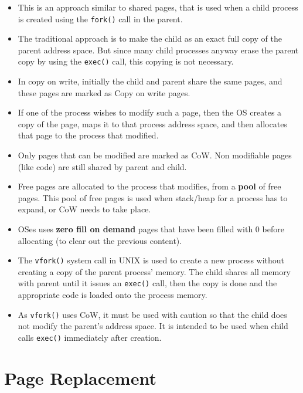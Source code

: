 \documentclass{article}
\theoremstyle{plain}
\theoremstyle{definition}
\begin{document}
\begin{itemize}
    \item This is an approach similar to shared pages, that is used when a child process is created using the \texttt{fork()} call in the parent. 
    
    \item The traditional approach is to make the child as an exact full copy of the parent address space. But since many child processes anyway erase the parent copy by using the \texttt{exec()} call, this copying is not necessary. 
    
    \item In copy on write, initially the child and parent share the same pages, and these pages are marked as Copy on write pages. 
    
    \item If one of the process wishes to modify such a page, then the OS creates a copy of the page, maps it to that process address space, and then allocates that page to the process that modified. 
    
    \item Only pages that can be modified are marked as CoW. Non modifiable pages (like code) are still shared by parent and child. 
    
    \item Free pages are allocated to the process that modifies, from a \textbf{pool} of free pages. This pool of free pages is used when stack/heap for a process has to expand, or CoW needs to take place. 
    
    \item OSes uses \textbf{zero fill on demand} pages that have been filled with 0 before allocating (to clear out the previous content). 
    
    \item The \texttt{vfork()} system call in UNIX is used to create a new process without creating a copy of the parent process' memory. The child shares all memory with parent until it issues an \texttt{exec()} call, then the copy is done and the appropriate code is loaded onto the process memory.
    
    \item As \texttt{vfork()} uses CoW, it must be used with caution so that the child does not modify the parent's address space. It is intended to be used when child calls \texttt{exec()} immediately after creation. 
\end{itemize}

\section{Page Replacement}
\end{document}
